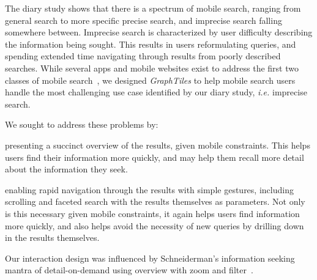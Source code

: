 The diary study shows that there is a spectrum of mobile search, ranging from general search to more specific precise search, and imprecise search falling somewhere between. Imprecise search is characterized by user difficulty describing the information being sought. This results in users reformulating queries, and spending extended time navigating through results from poorly described searches. While several apps and mobile websites exist to address the first two classes of mobile search~\cite{Cui:2008,Church:2011}, we designed \textit{GraphTiles} to help mobile search users handle the most challenging use case identified by our diary study, \textit{i.e.} imprecise search.

We sought to address these problems by: 
\begin{tight_itemize}
\item presenting a succinct overview of the results, given mobile constraints. This helps users find their information more quickly, and may help them recall more detail about the information they seek.
\item  enabling rapid navigation through the results with simple gestures, including scrolling and faceted search with the results themselves as parameters. Not only is this necessary given mobile constraints, it again helps users find information more quickly, and also helps avoid the necessity of new queries by drilling down in the results themselves. 

Our interaction design was influenced by Schneiderman's information seeking mantra of detail-on-demand using overview with zoom and filter~\cite{Shneiderman:1996}.
\end{tight_itemize}
%


